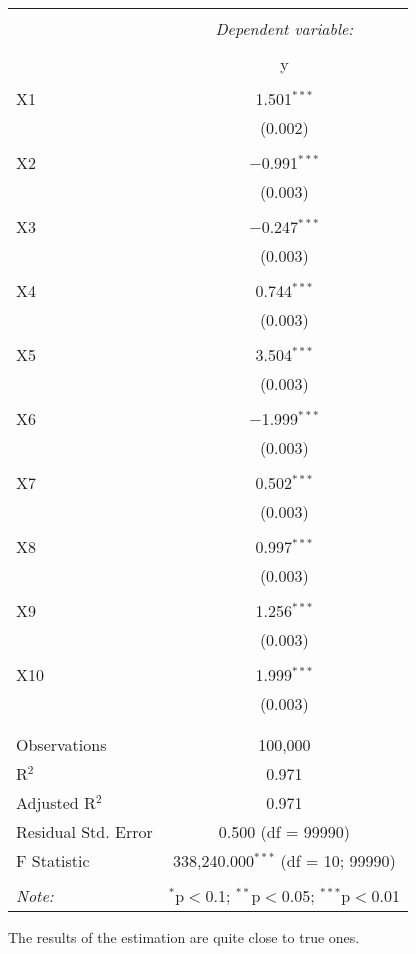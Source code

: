 \documentclass{article}
\begin{document}
\begin{table}[!htbp] \centering 
  \caption{} 
  \label{} 
\begin{tabular}{@{\extracolsep{5pt}}lc} 
\\[-1.8ex]\hline 
\hline \\[-1.8ex] 
 & \multicolumn{1}{c}{\textit{Dependent variable:}} \\ 
\cline{2-2} 
\\[-1.8ex] & y \\ 
\hline \\[-1.8ex] 
 X1 & 1.501$^{***}$ \\ 
  & (0.002) \\ 
  & \\ 
 X2 & $-$0.991$^{***}$ \\ 
  & (0.003) \\ 
  & \\ 
 X3 & $-$0.247$^{***}$ \\ 
  & (0.003) \\ 
  & \\ 
 X4 & 0.744$^{***}$ \\ 
  & (0.003) \\ 
  & \\ 
 X5 & 3.504$^{***}$ \\ 
  & (0.003) \\ 
  & \\ 
 X6 & $-$1.999$^{***}$ \\ 
  & (0.003) \\ 
  & \\ 
 X7 & 0.502$^{***}$ \\ 
  & (0.003) \\ 
  & \\ 
 X8 & 0.997$^{***}$ \\ 
  & (0.003) \\ 
  & \\ 
 X9 & 1.256$^{***}$ \\ 
  & (0.003) \\ 
  & \\ 
 X10 & 1.999$^{***}$ \\ 
  & (0.003) \\ 
  & \\ 
\hline \\[-1.8ex] 
Observations & 100,000 \\ 
R$^{2}$ & 0.971 \\ 
Adjusted R$^{2}$ & 0.971 \\ 
Residual Std. Error & 0.500 (df = 99990) \\ 
F Statistic & 338,240.000$^{***}$ (df = 10; 99990) \\ 
\hline 
\hline \\[-1.8ex] 
\textit{Note:}  & \multicolumn{1}{r}{$^{*}$p$<$0.1; $^{**}$p$<$0.05; $^{***}$p$<$0.01} \\ 
\end{tabular} 
\end{table} 
The results of the estimation are quite close to true ones.
\end{document}
